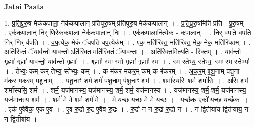 \documentclass[17pt]{extarticle}
\begin{document}
\textbf{Jatai Paata} \newline

1. प्र॒ति॒पू॒रु॒ष मेक॑कपाला॒ नेक॑कपालान् प्रतिपूरु॒षम् प्र॑तिपूरु॒ष मेक॑कपालान् । . प्र॒ति॒पू॒रु॒षमिति॑ प्रति - पू॒रु॒षम् । . एक॑कपाला॒न् निर् णिरेक॑कपाला॒ नेक॑कपाला॒न् निः । . एक॑कपाला॒नित्येक॑ - क॒पा॒ला॒न् । . निर् व॑पति वपति॒ निर् णिर् व॑पति । . व॒प॒त्येक॒ मेकं॑ ॅवपति वप॒त्येक᳚म् । . एक॒ मति॑रिक्त॒ मति॑रिक्त॒ मेक॒ मेक॒ मति॑रिक्तम् । . अति॑रिक्तं॒ ॅयाव॑न्तो॒ याव॒न्तो ऽति॑रिक्त॒ मति॑रिक्तं॒ ॅयाव॑न्तः । . अति॑रिक्त॒मित्यति॑ - रि॒क्त॒म् । . याव॑न्तो गृ॒ह्या॑ गृ॒ह्या॑ याव॑न्तो॒ याव॑न्तो गृ॒ह्याः᳚ । . गृ॒ह्याः᳚ स्मः स्मो गृ॒ह्या॑ गृ॒ह्याः᳚ स्मः । . स्म स्तेभ्य॒ स्तेभ्यः॒ स्मः स्म स्तेभ्यः॑ । . तेभ्यः॒ कम् कम् तेभ्य॒ स्तेभ्यः॒ कम् । . क म॑कर मकर॒म् कम् क म॑करम् । . अ॒क॒र॒म् प॒शू॒नाम् प॑शू॒ना म॑कर मकरम् पशू॒नाम् । . प॒शू॒नाꣳ शर्म॒ शर्म॑ पशू॒नाम् प॑शू॒नाꣳ शर्म॑ । . शर्मा᳚स्यसि॒ शर्म॒ शर्मा॑सि । . अ॒सि॒ शर्म॒ शर्मा᳚स्यसि॒ शर्म॑ । . शर्म॒ यज॑मानस्य॒ यज॑मानस्य॒ शर्म॒ शर्म॒ यज॑मानस्य । . यज॑मानस्य॒ शर्म॒ शर्म॒ यज॑मानस्य॒ यज॑मानस्य॒ शर्म॑ । . शर्म॑ मे मे॒ शर्म॒ शर्म॑ मे । . मे॒ य॒च्छ॒ य॒च्छ॒ मे॒ मे॒ य॒च्छ॒ । . य॒च्छैक॒ एको॑ यच्छ य॒च्छैकः॑ । . एक॑ ए॒वैवैक॒ एक॑ ए॒व । . ए॒व रु॒द्रो रु॒द्र ए॒वैव रु॒द्रः । . रु॒द्रो न न रु॒द्रो रु॒द्रो न । . न द्वि॒तीया॑य द्वि॒तीया॑य॒ न न द्वि॒तीया॑य । \newline
\end{document}
